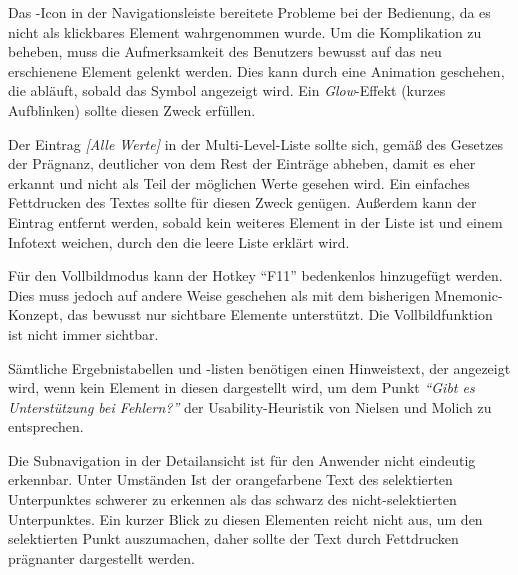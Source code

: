 Das -Icon in der Navigationsleiste bereitete Probleme bei der Bedienung, da es nicht als klickbares Element wahrgenommen wurde. Um die Komplikation zu beheben, muss die Aufmerksamkeit des Benutzers bewusst auf das neu erschienene Element gelenkt werden. Dies kann durch eine Animation geschehen, die abläuft, sobald das Symbol angezeigt wird. Ein \textit{Glow}-Effekt (kurzes Aufblinken) sollte diesen Zweck erfüllen.\par
Der Eintrag \textit{[Alle Werte]} in der Multi-Level-Liste sollte sich, gemäß des Gesetzes der Prägnanz, deutlicher von dem Rest der Einträge abheben, damit es eher erkannt und nicht als Teil der möglichen Werte gesehen wird. Ein einfaches Fettdrucken des Textes sollte für diesen Zweck genügen. Außerdem kann der Eintrag entfernt werden, sobald kein weiteres Element in der Liste ist und einem Infotext weichen, durch den die leere Liste erklärt wird.\par
Für den Vollbildmodus kann der Hotkey \enquote{F11} bedenkenlos hinzugefügt werden. Dies muss jedoch auf andere Weise geschehen als mit dem bisherigen Mnemonic-Konzept, das bewusst nur sichtbare Elemente unterstützt. Die Vollbildfunktion ist nicht immer sichtbar.\par
Sämtliche Ergebnistabellen und -listen benötigen einen Hinweistext, der angezeigt wird, wenn kein Element in diesen dargestellt wird, um dem Punkt \textit{\enquote{Gibt es Unterstützung bei Fehlern?}} der Usability-Heuristik von Nielsen und Molich zu entsprechen.\par
Die Subnavigation in der Detailansicht ist für den Anwender nicht eindeutig erkennbar. Unter Umständen Ist der orangefarbene Text des selektierten Unterpunktes schwerer zu erkennen als das schwarz des nicht-selektierten Unterpunktes. Ein kurzer Blick zu diesen Elementen reicht nicht aus, um den selektierten Punkt auszumachen, daher sollte der Text durch Fettdrucken prägnanter dargestellt werden.\par
